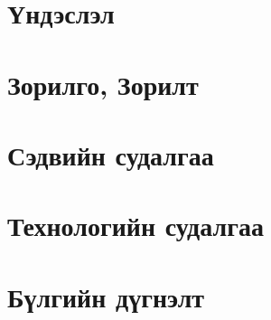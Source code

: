\section{Үндэслэл}


\section{Зорилго, Зорилт}


\section{Сэдвийн судалгаа}


\section{Технологийн судалгаа}


\section{Бүлгийн дүгнэлт}

